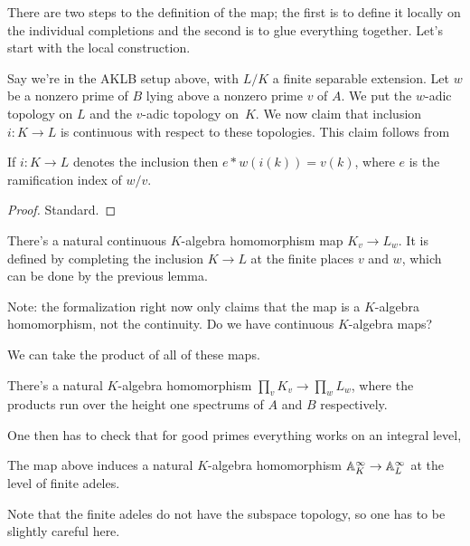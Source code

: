 There are two steps to the definition of the map; the first is to define it locally
on the individual completions and the second is to glue everything together. Let's
start with the local construction.

Say we're in the AKLB setup above, with $L/K$ a finite separable extension.
Let $w$ be a nonzero prime of $B$ lying above a nonzero prime $v$ of $A$.
We put the $w$-adic topology on $L$ and the $v$-adic topology on~$K$. We now claim
that inclusion $i:K\to L$ is continuous with respect to these topologies. This
claim follows from

\begin{lemma} If $i:K\to L$ denotes the inclusion then $e*w(i(k))=v(k)$, where
  $e$ is the ramification index of $w/v$.
  \label{IsDedekindDomain.HeightOneSpectrum.valuation_comap}
\end{lemma}
\begin{proof}
   Standard.
\end{proof}

\begin{definition}
  \label{IsDedekindDomain.HeightOneSpectrum.adicCompletion_comap_algHom}
  There's a natural continuous $K$-algebra homomorphism map $K_v\to L_w$. It is defined by completing
  the inclusion $K\to L$ at the finite places $v$ and $w$, which can be done
  by the previous lemma.
\end{definition}

Note: the formalization right now only claims that the map is a $K$-algebra homomorphism,
not the continuity. Do we have continuous $K$-algebra maps?

We can take the product of all of these maps.

\begin{definition}
  \label{DedekindDomain.ProdAdicCompletions.baseChange}
  There's a natural $K$-algebra homomorphism $\prod_v K_v\to\prod_w L_w$, where the
  products run over the height one spectrums of $A$ and $B$ respectively.
\end{definition}

One then has to check that for good primes everything works on an integral level,

\begin{definition}
  The map above induces a natural $K$-algebra homomorphism $\mathbb{A}_K^\infty\to\mathbb{A}_L^\infty$
  at the level of finite adeles.
\end{definition}

Note that the finite adeles do not have the subspace topology, so one has to be slightly
careful here.
